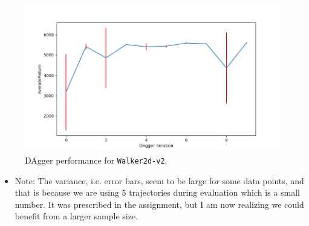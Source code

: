 \documentclass[11pt]{article}
\begin{document}
\begin{figure}[htbp]
\centering
\includegraphics[width=.9\linewidth]{./Figure_3.png}
\caption{DAgger performance for \texttt{Walker2d-v2}.}
\end{figure}

\begin{itemize}
\item Note: The variance, i.e. error bars, seem to be large for some data points, and that is because we are using 5 trajectories during evaluation which is a small number. It was prescribed in the assignment, but I am now realizing we could benefit from a larger sample size.
\end{itemize}
\end{document}
